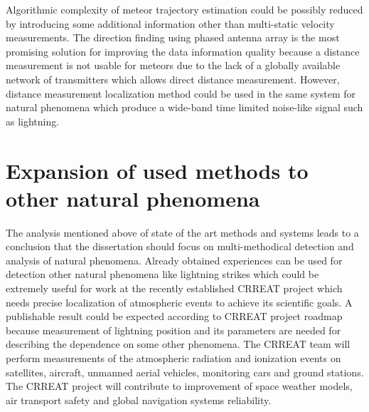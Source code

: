 \documentclass[twoside]{ctuthesis}
\theoremstyle{plain}
\theoremstyle{definition}
\theoremstyle{note}
\begin{document}
Algorithmic complexity of meteor trajectory estimation could be possibly reduced by introducing some additional information other than multi-static velocity measurements.  The direction finding using phased antenna array is the most promising solution for improving the data information quality because a distance measurement is not usable for meteors due to the lack of a globally available network of transmitters which allows direct distance measurement.  However, distance measurement localization method could be used in the same system for natural phenomena which produce a wide-band time limited noise-like signal such as lightning.

\section{Expansion of used methods to other natural phenomena}

The analysis mentioned above of state of the art methods and systems leads to a conclusion that the dissertation should focus on multi-methodical detection and analysis of natural phenomena. 
Already obtained experiences can be used for detection other natural phenomena like lightning strikes which could be extremely useful for work at the recently established CRREAT project which needs precise localization of atmospheric events to achieve its scientific goals. A publishable result could be expected according to CRREAT project roadmap because measurement of lightning position and its parameters are needed for describing the dependence on some other phenomena.  The CRREAT team will perform measurements of the atmospheric radiation and ionization events on satellites, aircraft, unmanned aerial vehicles, monitoring cars and ground stations. The CRREAT project will contribute to improvement of space weather models, air transport safety and global navigation systems reliability.
\end{document}
